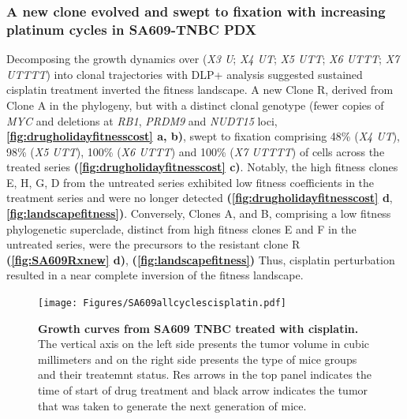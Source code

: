 \subsubsection{A new clone evolved and swept to fixation with increasing platinum cycles in SA609-TNBC PDX}
Decomposing the growth dynamics over (\textit{X3 U}; \textit{X4 UT}; \textit{X5 UTT}; \textit{X6 UTTT}; \textit{X7 UTTTT}) into clonal trajectories with DLP+ analysis suggested sustained cisplatin treatment inverted the fitness landscape. A new Clone R,  derived from Clone A in the phylogeny, but with a distinct clonal genotype (fewer copies of \textit{MYC} and deletions at \textit{RB1}, \textit{PRDM9} and \textit{NUDT15} loci, \textbf{\autoref{fig:drugholidayfitnesscost} a, b)}, swept to fixation comprising 48\% (\textit{X4 UT}), 98\% (\textit{X5 UTT}), 100\% (\textit{X6 UTTT}) and 100\% (\textit{X7 UTTTT}) of cells across the treated series \textbf{(\autoref{fig:drugholidayfitnesscost} c)}. Notably, the high fitness clones E, H, G, D from the untreated series exhibited low fitness coefficients in the treatment series and were no longer detected \textbf{(\autoref{fig:drugholidayfitnesscost} d}, \textbf{\autoref{fig:landscapefitness})}. Conversely, Clones A, and B, comprising a low fitness phylogenetic superclade, distinct from high fitness clones E and F in the untreated series, were the precursors to the resistant clone R \textbf{(\autoref{fig:SA609Rxnew} d)},    \textbf{(\autoref{fig:landscapefitness})} Thus, cisplatin perturbation resulted in a near complete inversion of the fitness landscape.



\begin{figure}
\centering
\texttt{[image: Figures/SA609allcyclescisplatin.pdf]}
	
\caption[Representative growth curves from SA609 TNBC treated with cisplatin]
	{\small
	\textbf{Growth curves from SA609 TNBC treated with cisplatin.}
	   The vertical axis on the left side presents the tumor volume in cubic millimeters and on the right side presents the type of mice groups and their treatemnt status. Res arrows in the top panel indicates the time of start of drug treatment and black arrow indicates the tumor that was taken to generate the next generation of mice.
	}
	\label{fig:SA609allcyclescisplatin}
\end{figure}




